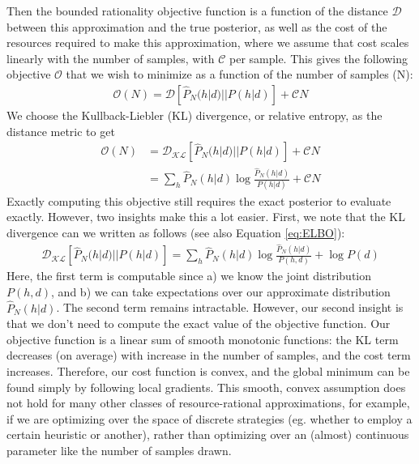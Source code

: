 Then the bounded rationality objective function is a function of the distance $\mathcal{D}$ between this approximation and the true posterior, as well as the cost of the resources required to make this approximation, where we assume that cost scales linearly with the number of samples, with $\mathcal{C}$ per sample. This gives the following objective $\mathcal{O}$ that we wish to minimize as a function of the number of samples (N):
\begin{align}
\mathcal{O}(N) = \mathcal{D}[\hat{P}_N(h|d)||P(h|d)] + \mathcal{C}N
\end{align}
We choose the Kullback-Liebler (KL) divergence, or relative entropy, as the distance metric to get
\begin{align}
\mathcal{O}(N) &= \mathcal{D_{KL}}[\hat{P}_N(h|d)||P(h|d)] + \mathcal{C}N \\
& =  \sum_h \hat{P}_N(h|d) \log \frac{\hat{P}_N(h|d)}{P(h|d)} + \mathcal{C}N
\end{align}
Exactly computing this objective still requires the exact posterior to evaluate exactly. However, two insights make this a lot easier. First, we note that the KL divergence can we written as follows (see also Equation \ref{eq:ELBO}):
\begin{align}
\mathcal{D_{KL}}[\hat{P}_N(h|d)||P(h|d)]  = \sum_h \hat{P}_N(h|d) \log \frac{\hat{P}_N(h|d)}{P(h,d)} + \log P(d)
\label{eq:split_KL}
\end{align}
Here, the first term is computable since a) we know the joint distribution $P(h,d)$,  and b) we can take expectations over our approximate distribution $\hat{P}_N(h|d)$. The second term remains intractable. However, our second insight is that we don't need to compute the exact value of the objective function. Our objective function is a linear sum of smooth monotonic functions: the KL term decreases (on average) with increase in the number of samples, and the cost term increases. Therefore, our cost function is convex, and the global minimum can be found simply by following local gradients. This smooth, convex assumption does not hold for many other classes of resource-rational approximations, for example, if we are optimizing over the space of discrete strategies (eg. whether to employ a certain heuristic or another), rather than optimizing over an (almost) continuous parameter like the number of samples drawn.

